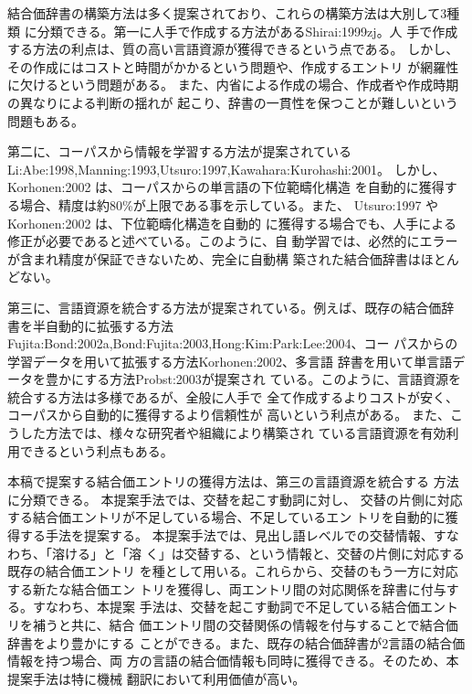\documentclass[japanese]{jnlp}
\newcommand{\citep}{}
\newcommand{\citet}{}
\def\smpt#1{}
\renewcommand{\smpt}[1]{}
\begin{document}
\smpt{結合価辞書の構築方法の先行研究}


結合価辞書の構築方法は多く提案されており、これらの構築方法は大別して3種類
に分類できる。第一に人手で作成する方法がある\citep{Shirai:1999zj}。人
手で作成する方法の利点は、質の高い言語資源が獲得できるという点である。
しかし、その作成にはコストと時間がかかるという問題や、作成するエントリ
が網羅性に欠けるという問題がある。
また、内省による作成の場合、作成者や作成時期の異なりによる判断の揺れが
起こり、辞書の一貫性を保つことが難しいという問題もある。


第二に、コーパスから情報を学習する方法が提案されている
\citep{Li:Abe:1998,Manning:1993,Utsuro:1997,Kawahara:Kurohashi:2001}。
しかし、\citet{Korhonen:2002} は、コーパスからの単言語の下位範疇化構造
を自動的に獲得する場合、精度は約80\%が上限である事を示している。また、
\citet{Utsuro:1997} や\citet{Korhonen:2002} は、下位範疇化構造を自動的
に獲得する場合でも、人手による修正が必要であると述べている。このように、自
動学習では、必然的にエラーが含まれ精度が保証できないため、完全に自動構
築された結合価辞書はほとんどない。

第三に、言語資源を統合する方法が提案されている。例えば、既存の結合価辞
書を半自動的に拡張する方法
\citep{Fujita:Bond:2002a,Bond:Fujita:2003,Hong:Kim:Park:Lee:2004}、コー
パスからの学習データを用いて拡張する方法\citep{Korhonen:2002}、多言語
辞書を用いて単言語データを豊かにする方法\citep{Probst:2003}が提案され
ている。このように、言語資源を統合する方法は多様であるが、全般に人手で
全て作成するよりコストが安く、コーパスから自動的に獲得するより信頼性が
高いという利点がある。
また、こうした方法では、様々な研究者や組織により構築され
ている言語資源を有効利用できるという利点もある。


\smpt{提案手法} 


本稿で提案する結合価エントリの獲得方法は、第三の言語資源を統合する
方法に分類できる。
本提案手法では、交替を起こす動詞に対し、
交替の片側に対応する結合価エントリが不足している場合、不足しているエン
トリを自動的に獲得する手法を提案する。
本提案手法では、見出し語レベルでの交替情報、すなわち、「溶ける」と「溶
く」は交替する、という情報と、交替の片側に対応する既存の結合価エントリ
を種として用いる。これらから、交替のもう一方に対応する新たな結合価エン
トリを獲得し、両エントリ間の対応関係を辞書に付与する。すなわち、本提案
手法は、交替を起こす動詞で不足している結合価エントリを補うと共に、結合
価エントリ間の交替関係の情報を付与することで結合価辞書をより豊かにする
ことができる。また、既存の結合価辞書が2言語の結合価情報を持つ場合、両
方の言語の結合価情報も同時に獲得できる。そのため、本提案手法は特に機械
翻訳において利用価値が高い。
\end{document}
